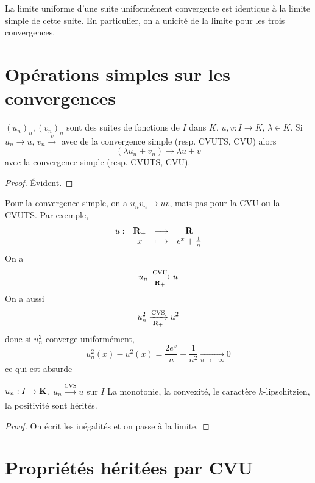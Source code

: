 \begin{rem}
    La limite uniforme d'une suite uniformément convergente est identique à la limite simple de cette suite. En particulier, on a unicité de la limite pour les trois convergences.
\end{rem}

\section{Opérations simples sur les convergences}

\begin{prop}
    \Hyp $(u_n)_n,(v_n)_n$ sont des suites de fonctions de $I$ dans $K$, $u,v:I\to K$, $\lambda\in K$.
    \Conc Si $u_n\xrightarrow{}u$, $v_n\xrightarrow v$ avec de la convergence simple (resp. CVUTS, CVU) alors \[
        (\lambda u_n+v_n)\xrightarrow{}\lambda u+v
    \]
    avec la convergence simple (resp. CVUTS, CVU).
\end{prop}

\begin{proof}
    Évident.
\end{proof}

\begin{rem}
Pour la convergence simple, on a $u_nv_n \longrightarrow uv$, mais pas pour la  CVU ou la CVUTS. Par exemple, \[
\begin{matrix}
    u:& \mathbf R_+ & \longrightarrow &\mathbf R  \\
    & x & \longmapsto & e^x+\frac{1}{n}
\end{matrix}
\] 
On a \[
    u_n \xrightarrow[\mathbf R_+]{\text{CVU}} u
\] 
On a aussi  \[
    u_n^2 \xrightarrow[\mathbf R_+]{\text{CVS}} u^2
\]
donc si $u_n^2$ converge uniformément, \[
    u_n^2(x)-u^2(x) = \frac{2e^x}{n}+\frac{1}{n^2} \xrightarrow[n\to+\infty]{}0
\] 
ce qui est absurde
\end{rem}

\begin{prop}
    \Hyp $u_n: I\to \mathbf K$, $u_n \xrightarrow[]{\text{CVS}} u$ sur $I$
    \Conc La monotonie, la convexité, le caractère $k$-lipschitzien, la positivité sont hérités.
\end{prop}

\begin{proof}
On écrit les inégalités et on passe à la limite.
\end{proof}

\section{Propriétés héritées par CVU}

